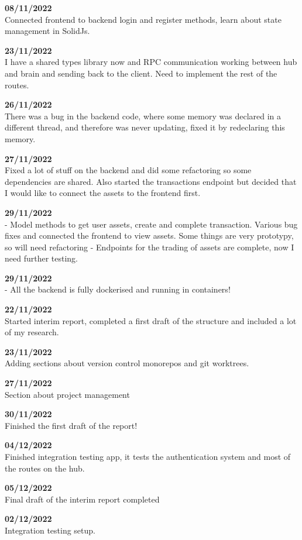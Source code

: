 \documentclass[titlepage]{article}
\begin{document}
\textbf{08/11/2022} \\
Connected frontend to backend login and register methods, learn about state management in SolidJs.

\textbf{23/11/2022} \\
I have a shared types library now and RPC communication working between hub and brain and sending back to the client. Need to implement the rest of the routes.

\textbf{26/11/2022} \\
There was a bug in the backend code, where some memory was declared in a different thread, and therefore was never updating, fixed it by redeclaring this memory.

\textbf{27/11/2022} \\
Fixed a lot of stuff on the backend and did some refactoring so some dependencies are shared. Also started the transactions endpoint but decided that I would like to connect the assets to the frontend first.

\textbf{29/11/2022} \\
 - Model methods to get user assets, create and complete transaction. Various bug fixes and connected the frontend to view assets. Some things are very prototypy, so will need refactoring
 - Endpoints for the trading of assets are complete, now I need further testing.

\textbf{29/11/2022} \\
 - All the backend is fully dockerised and running in containers!

\textbf{22/11/2022} \\
Started interim report, completed a first draft of the structure and included a lot of my research.

\textbf{23/11/2022} \\
Adding sections about version control monorepos and git worktrees.

\textbf{27/11/2022} \\
Section about project management

\textbf{30/11/2022} \\
Finished the first draft of the report!

\textbf{04/12/2022} \\
Finished integration testing app, it tests the authentication system and most of the routes on the hub.

\textbf{05/12/2022} \\
Final draft of the interim report completed

\textbf{02/12/2022} \\
Integration testing setup.
\end{document}
